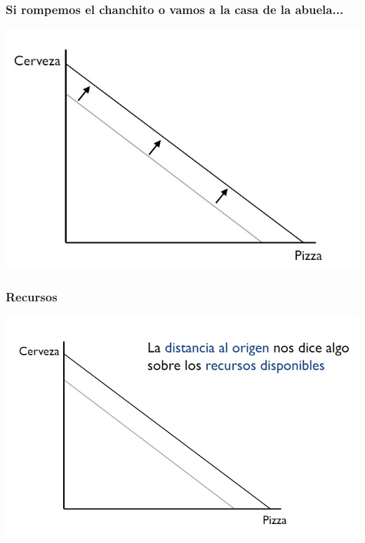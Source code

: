 \documentclass{beamer}
\begin{document}
\begin{frame}
\frametitle{Si rompemos el chanchito o vamos a la casa de la abuela...}
\centering
\includegraphics[scale=0.55]{../Figures/Tema_02.9_rp7.jpg}
\end{frame}

\begin{frame}
\frametitle{Recursos}
\centering
\includegraphics[scale=0.55]{../Figures/Tema_02.10_rp8.jpg}
\end{frame}
\end{document}
